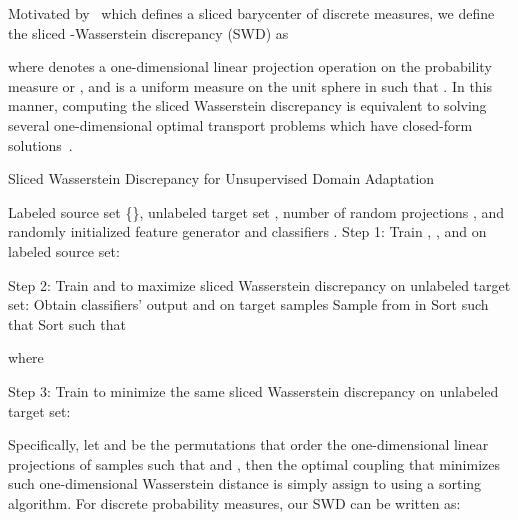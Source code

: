 \documentclass[10pt,twocolumn,letterpaper]{article}
\begin{document}
Motivated by~\cite{rabin2011wasserstein} which defines a sliced barycenter of discrete measures, we define the sliced -Wasserstein discrepancy (SWD) as

where  denotes a one-dimensional linear projection operation on the probability measure  or , and  is a uniform measure on the unit sphere  in  such that . In this manner, computing the sliced Wasserstein discrepancy is equivalent to solving several one-dimensional optimal transport problems which have closed-form solutions~\cite{rabin2011wasserstein}.


\begin{algorithm}[t!]
\footnotesize
\caption{Sliced Wasserstein Discrepancy for Unsupervised Domain Adaptation}
\label{alg:swd}
\begin{algorithmic}
\REQUIRE Labeled source set \{\}, unlabeled target set , number of random projections , and randomly initialized feature generator  and classifiers .
\STATE Step 1: Train , , and  on labeled source set:
\STATE
\setlength{\leftskip}{8.8mm}
\vspace{-2.5mm}
 
\setlength{\leftskip}{0pt}
 \vspace{-2mm}
\STATE Step 2: Train  and  to maximize sliced Wasserstein discrepancy
\STATE
\setlength{\leftskip}{8.8mm}
 \vspace{-3.5mm}
on unlabeled target set:
\STATE Obtain classifiers' output  and  on target samples
\STATE Sample  from  in 
\STATE Sort  such that  
\STATE Sort  such that 
 \vspace{-1mm}
 
 \vspace{-3mm}
\STATE where 

\setlength{\leftskip}{0pt}
\STATE Step 3: Train  to minimize the same sliced Wasserstein discrepancy
\STATE
\setlength{\leftskip}{8.8mm}
\vspace{-3.5mm}
on unlabeled target set:
 \vspace{-1.5mm}
 
\setlength{\leftskip}{0pt}
 \vspace{-5mm}
\ENDWHILE
\end{algorithmic}
\end{algorithm} 
Specifically, let  and  be the permutations that order the  one-dimensional linear projections of  samples such that  and , then the optimal coupling  that minimizes such one-dimensional Wasserstein distance is simply assign  to  using a sorting algorithm.
For discrete probability measures, our SWD can be written as:
 
\end{document}

